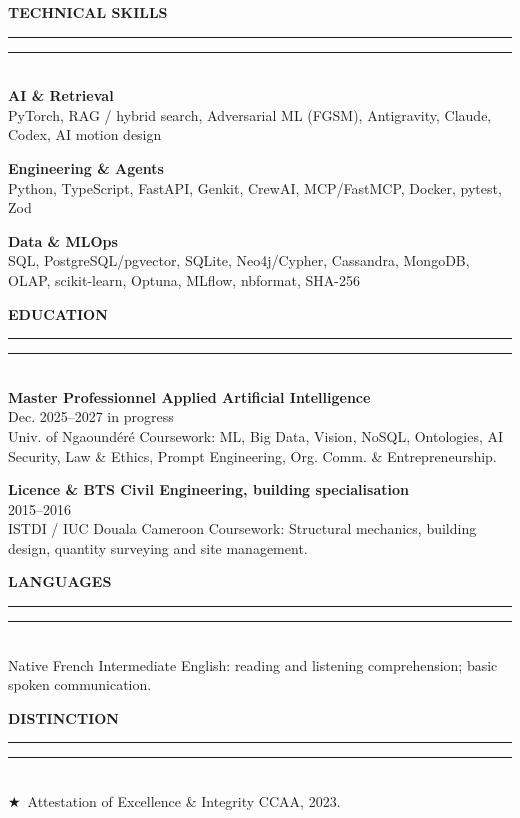 \documentclass[10pt,a4paper]{article}
\newcommand{\sideSecTitle}[1]{%
  \vspace{11pt}%
  {\fontsize{10.3}{12.4}\selectfont\textbf{\color{sectionNavy}\MakeUppercase{#1}}}\\[2.5pt]%
  {\color{accentTeal}\rule{14mm}{1.1pt}\color{subtleRule}\rule{\dimexpr\linewidth-14mm\relax}{0.55pt}}\\[5.5pt]%
}
\begin{document}
\noindent\begin{minipage}[t]{0.310\textwidth}
  \raggedright
  \vspace{0pt}
  \sideSecTitle{Technical skills}
  \textbf{\color{sectionNavy}\fontsize{10.0}{12.2}\selectfont AI \& Retrieval}\\[2.2pt]
  {\fontsize{9.6}{13.0}\selectfont\color{bodyText}PyTorch, RAG / hybrid search, Adversarial ML (FGSM), Antigravity, Claude, Codex, AI motion design}
\vspace{10pt}

  \textbf{\color{sectionNavy}\fontsize{10.0}{12.2}\selectfont Engineering \& Agents}\\[2.2pt]
  {\fontsize{9.6}{13.0}\selectfont\color{bodyText}Python, TypeScript, FastAPI, Genkit, CrewAI, MCP/FastMCP, Docker, pytest, Zod}
\vspace{10pt}

  \textbf{\color{sectionNavy}\fontsize{10.0}{12.2}\selectfont Data \& MLOps}\\[2.2pt]
  {\fontsize{9.6}{13.0}\selectfont\color{bodyText}SQL, PostgreSQL/pgvector, SQLite, Neo4j/Cypher, Cassandra, MongoDB, OLAP, scikit-learn, Optuna, MLflow, nbformat, SHA-256}

  \vspace{6pt}
  \sideSecTitle{Education}
  \textbf{\color{primaryDark}\fontsize{9.9}{12.5}\selectfont Master Professionnel \textperiodcentered{} Applied Artificial Intelligence}\\[1.8pt]
  {\fontsize{8.9}{11.2}\selectfont\color{mutedSlate}Dec. 2025--2027 \textperiodcentered{} in progress}\\[2.5pt]
  {\fontsize{9.5}{12.9}\selectfont\color{bodyText}Univ. of Ngaoundéré \textperiodcentered{} Coursework: ML, Big Data, Vision, NoSQL, Ontologies, AI Security, Law \& Ethics, Prompt Engineering, Org. Comm. \& Entrepreneurship.}
\vspace{11pt}

  \textbf{\color{primaryDark}\fontsize{9.9}{12.5}\selectfont Licence \& BTS \textperiodcentered{} Civil Engineering, building specialisation}\\[1.8pt]
  {\fontsize{8.9}{11.2}\selectfont\color{mutedSlate}2015--2016}\\[2.5pt]
  {\fontsize{9.5}{12.9}\selectfont\color{bodyText}ISTDI / IUC Douala \textperiodcentered{} Cameroon \textperiodcentered{} Coursework: Structural mechanics, building design, quantity surveying and site management.}

  \vspace{6pt}
  \sideSecTitle{Languages}
  {\fontsize{9.6}{13.1}\selectfont\color{bodyText}Native French \textperiodcentered{} Intermediate English: reading and listening comprehension; basic spoken communication.}

  \vspace{6pt}
  \sideSecTitle{Distinction}
  {\fontsize{9.6}{13.1}\selectfont\color{bodyText}\textcolor{goldAccent}{$\bigstar$}\ Attestation of Excellence \& Integrity \textperiodcentered{} CCAA, 2023.}
\end{minipage}%
\end{document}

